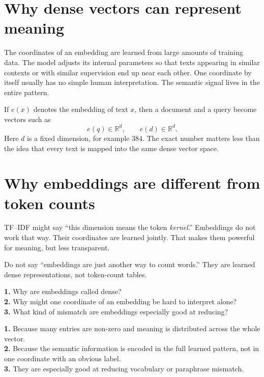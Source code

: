\documentclass[11pt,oneside]{report}
\begin{document}
\section*{Why dense vectors can represent meaning}
The coordinates of an embedding are learned from large amounts of training data. The model adjusts its internal parameters so that texts appearing in similar contexts or with similar supervision end up near each other. One coordinate by itself usually has no simple human interpretation. The semantic signal lives in the entire pattern.

\begin{formulabox}
If $e(x)$ denotes the embedding of text $x$, then a document and a query become vectors such as
\[
 e(q)\in\mathbb{R}^{d}, \qquad e(d)\in\mathbb{R}^{d}.
\]
Here $d$ is a fixed dimension, for example $384$. The exact number matters less than the idea that every text is mapped into the same dense vector space.
\end{formulabox}

\section*{Why embeddings are different from token counts}
TF--IDF might say ``this dimension means the token \emph{kernel}.'' Embeddings do not work that way. Their coordinates are learned jointly. That makes them powerful for meaning, but less transparent.

\begin{warningbox}
Do not say ``embeddings are just another way to count words.'' They are learned dense representations, not token-count tables.
\end{warningbox}

\begin{selfcheckbox}
\textbf{1.} Why are embeddings called dense?\\
\textbf{2.} Why might one coordinate of an embedding be hard to interpret alone?\\
\textbf{3.} What kind of mismatch are embeddings especially good at reducing?
\end{selfcheckbox}

\begin{answerbox}
\textbf{1.} Because many entries are non-zero and meaning is distributed across the whole vector.\\
\textbf{2.} Because the semantic information is encoded in the full learned pattern, not in one coordinate with an obvious label.\\
\textbf{3.} They are especially good at reducing vocabulary or paraphrase mismatch.
\end{answerbox}
\end{document}
